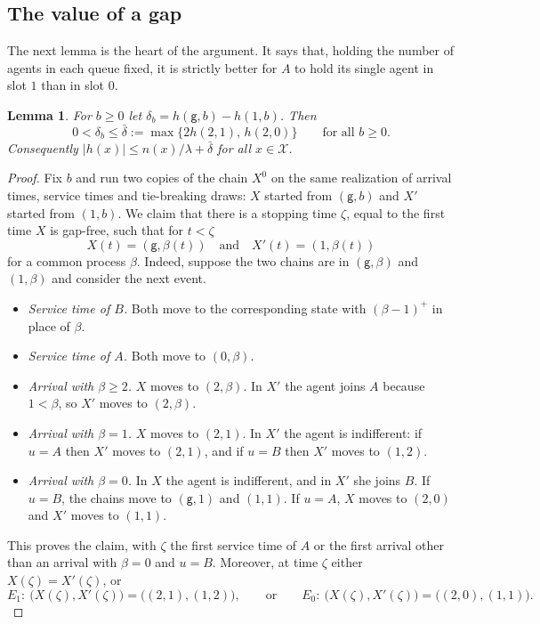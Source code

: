 \documentclass[11pt]{article}
\newtheorem{blem}[bthm]{Lemma}
\theoremstyle{definition}
\theoremstyle{remark}
\newcommand{\cX}{\mathcal{X}}
\newcommand{\gp}{\mathsf{g}}
\begin{document}
\subsection{The value of a gap}

The next lemma is the heart of the argument. It says that, holding the number
of agents in each queue fixed, it is strictly better for $A$ to hold its single
agent in slot $1$ than in slot $0$.

\begin{blem}\label{lem:gap}
For $b\ge0$ let $\delta_b=h(\gp,b)-h(1,b)$. Then
\[
  0<\delta_b\le\bar\delta:=\max\{2h(2,1),\,h(2,0)\}\qquad\text{for all }b\ge0.
\]
Consequently $|h(x)|\le n(x)/\lambda+\bar\delta$ for all $x\in\cX$.
\end{blem}

\begin{proof}
Fix $b$ and run two copies of the chain $X^0$ on the same realization of
arrival times, service times and tie-breaking draws: $X$ started from
$(\gp,b)$ and $X'$ started from $(1,b)$. We claim that there is a stopping
time $\zeta$, equal to the first time $X$ is gap-free, such that for $t<\zeta$
\[
  X(t)=(\gp,\beta(t))\quad\text{and}\quad X'(t)=(1,\beta(t))
\]
for a common process $\beta$. Indeed, suppose the two chains are in
$(\gp,\beta)$ and $(1,\beta)$ and consider the next event.
\begin{itemize}
\item \emph{Service time of $B$.} Both move to the corresponding state with
  $(\beta-1)^+$ in place of $\beta$.
\item \emph{Service time of $A$.} Both move to $(0,\beta)$.
\item \emph{Arrival with $\beta\ge2$.} $X$ moves to $(2,\beta)$. In $X'$ the
  agent joins $A$ because $1<\beta$, so $X'$ moves to $(2,\beta)$.
\item \emph{Arrival with $\beta=1$.} $X$ moves to $(2,1)$. In $X'$ the agent is
  indifferent: if $u=A$ then $X'$ moves to $(2,1)$, and if $u=B$ then $X'$
  moves to $(1,2)$.
\item \emph{Arrival with $\beta=0$.} In $X$ the agent is indifferent, and in
  $X'$ she joins $B$. If $u=B$, the chains move to $(\gp,1)$ and $(1,1)$. If
  $u=A$, $X$ moves to $(2,0)$ and $X'$ moves to $(1,1)$.
\end{itemize}
This proves the claim, with $\zeta$ the first service time of $A$ or the first
arrival other than an arrival with $\beta=0$ and $u=B$. Moreover, at time
$\zeta$ either $X(\zeta)=X'(\zeta)$, or
\[
  E_1:\ \bigl(X(\zeta),X'(\zeta)\bigr)=\bigl((2,1),(1,2)\bigr),
  \qquad\text{or}\qquad
  E_0:\ \bigl(X(\zeta),X'(\zeta)\bigr)=\bigl((2,0),(1,1)\bigr).
\]


\end{proof}
\end{document}
